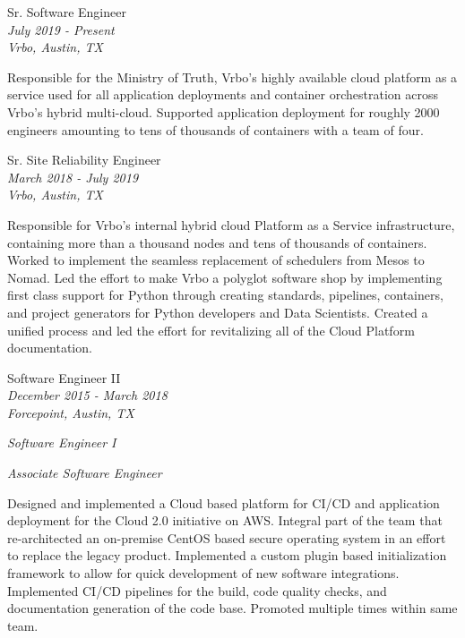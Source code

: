 \documentclass[10pt]{article} %
\begin{document}
\begin{minipage}[t]{0.5\textwidth}
{\raggedright\large Sr. Software Engineer\\
\textit{July 2019 - Present}\\
\textit{Vrbo, Austin, TX} \\[5pt]}

\normalsize{Responsible for the Ministry of Truth, Vrbo's highly available cloud platform as a service used for all application deployments and container orchestration across Vrbo's hybrid multi-cloud. Supported application deployment for roughly 2000 engineers amounting to tens of thousands of containers with a team of four. }\\


{\raggedright\large Sr. Site Reliability Engineer\\
\textit{March 2018 - July 2019}\\
\textit{Vrbo, Austin, TX} \\[5pt]}

\normalsize{Responsible for Vrbo's internal hybrid cloud Platform as a Service infrastructure, containing more than a thousand nodes and tens of thousands of containers. Worked to implement the seamless replacement of schedulers from Mesos to Nomad. Led the effort to make Vrbo a polyglot software shop by implementing first class support for Python through creating standards, pipelines, containers, and project generators for Python developers and Data Scientists. Created a unified process and led the effort for revitalizing all of the Cloud Platform documentation.}\\


{
\raggedright\large  Software Engineer II\\
\textit{December 2015 - March 2018}\\
\textit{Forcepoint, Austin, TX}\\
\raggedright\small \textit{Software Engineer I}\\
\raggedright\small \textit{Associate Software Engineer}\\
[5pt]
}

\normalsize{Designed and implemented a Cloud based platform for CI/CD and application deployment for the Cloud 2.0 initiative on AWS. Integral part of the team that re-architected an on-premise CentOS based secure operating system in an effort to replace the legacy product. Implemented a custom plugin based initialization framework to allow for quick development of new software integrations. Implemented CI/CD pipelines for the build, code quality checks, and documentation generation of the code base. Promoted multiple times within same team.}\\


\end{minipage} %
\end{document}
